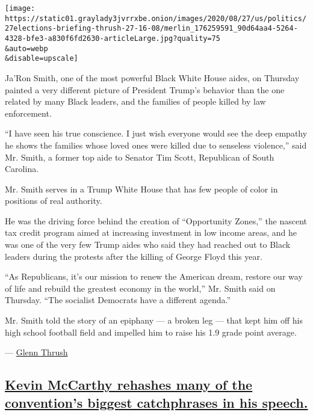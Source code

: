 \texttt{[image: https://static01.graylady3jvrrxbe.onion/images/2020/08/27/us/politics/27elections-briefing-thrush-27-16-08/merlin\_176259591\_90d64aa4-5264-4328-bfe3-a830f6fd2630-articleLarge.jpg?quality=75\\\&auto=webp\\\&disable=upscale]}

Ja'Ron Smith, one of the most powerful Black White House aides, on
Thursday painted a very different picture of President Trump's behavior
than the one related by many Black leaders, and the families of people
killed by law enforcement.

``I have seen his true conscience. I just wish everyone would see the
deep empathy he shows the families whose loved ones were killed due to
senseless violence,'' said Mr. Smith, a former top aide to Senator Tim
Scott, Republican of South Carolina.

Mr. Smith serves in a Trump White House that has few people of color in
positions of real authority.

He was the driving force behind the creation of ``Opportunity Zones,''
the nascent tax credit program aimed at increasing investment in low
income areas, and he was one of the very few Trump aides who said they
had reached out to Black leaders during the protests after the killing
of George Floyd this year.

``As Republicans, it's our mission to renew the American dream, restore
our way of life and rebuild the greatest economy in the world,'' Mr.
Smith said on Thursday. ``The socialist Democrats have a different
agenda.''

Mr. Smith told the story of an epiphany --- a broken leg --- that kept
him off his high school football field and impelled him to raise his 1.9
grade point average.

--- \href{https://www.nytimes3xbfgragh.onion/by/glenn-thrush}{Glenn
Thrush}

\hypertarget{kevin-mccarthy-rehashes-many-of-the-conventions-biggest-catchphrases-in-his-speech}{%
\subsection{\texorpdfstring{\protect\hyperlink{kevin-mccarthy-rehashes-many-of-the-conventions-biggest-catchphrases-in-his-speech}{Kevin
McCarthy rehashes many of the convention's biggest catchphrases in his
speech.}}{Kevin McCarthy rehashes many of the convention's biggest catchphrases in his speech.}}\label{kevin-mccarthy-rehashes-many-of-the-conventions-biggest-catchphrases-in-his-speech}}

